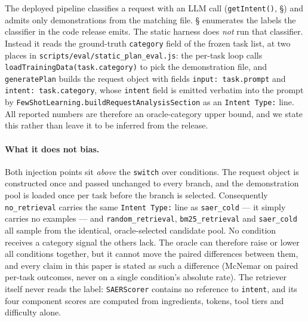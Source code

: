 \documentclass[letterpaper]{article} %
\newcommand{\bodyref}[1]{\getrefnumber{#1}}
\begin{document}
The deployed pipeline classifies a request with an LLM call
(\texttt{getIntent()}, \S\bodyref{sec:catfilter}) and admits only
demonstrations from the matching file.  \S\bodyref{sec:catfilter}
enumerates the labels the classifier in the code release emits.  The
static harness does \emph{not} run that classifier.  Instead it reads
the ground-truth \texttt{category} field of the frozen task list, at two
places in \texttt{scripts/eval/static\_plan\_eval.js}: the per-task loop
calls \texttt{loadTrainingData(task.\-category)} to pick the
demonstration file, and \texttt{generatePlan} builds the request object
with fields \texttt{input: task.prompt} and
\texttt{intent: task.category}, whose
\texttt{intent} field is emitted verbatim into the prompt by
\texttt{FewShotLearning.\-buildRequestAnalysisSection} as an
\texttt{Intent Type:} line.  All reported numbers are therefore an
oracle-category upper bound, and we state this rather than leave it to
be inferred from the release.

\paragraph{What it does not bias.}  Both injection points sit
\emph{above} the \texttt{switch} over conditions.  The request object is
constructed once and passed unchanged to every branch, and the
demonstration pool is loaded once per task before the branch is
selected.  Consequently \texttt{no\_retrieval} carries the same
\texttt{Intent Type:} line as \texttt{saer\_cold} --- it simply carries
no examples --- and \texttt{random\_retrieval},
\texttt{bm25\_retrieval} and \texttt{saer\_cold} all sample from the
identical, oracle-selected candidate pool.  No condition receives a
category signal the others lack.  The oracle can therefore raise or
lower all conditions together, but it cannot move the paired differences
between them, and every claim in this paper is stated as such a
difference (McNemar on paired per-task outcomes, never on a single
condition's absolute rate).  The retriever itself never reads the label:
\texttt{SAERScorer} contains no reference to \texttt{intent}, and its
four component scores are computed from ingredients, tokens, tool tiers
and difficulty alone.
\end{document}
